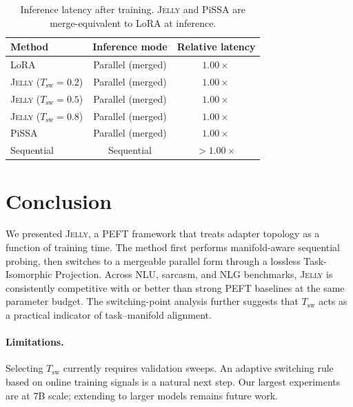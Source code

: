 \documentclass{article}
\newcommand{\Tswitch}{T_{\mathrm{sw}}}
\newcommand{\jelly}{\textsc{Jelly}}
\begin{document}
\begin{table}[!ht]
\caption{Inference latency after training. \jelly{} and PiSSA are merge-equivalent to LoRA at inference.}
\label{tab:inference_latency}
\centering
\small
\begin{tabular}{lcc}
\toprule
\textbf{Method} & \textbf{Inference mode} & \textbf{Relative latency} \\
\midrule
LoRA                       & Parallel (merged) & $1.00\times$ \\
\jelly{} ($\Tswitch=0.2$) & Parallel (merged) & $1.00\times$ \\
\jelly{} ($\Tswitch=0.5$) & Parallel (merged) & $1.00\times$ \\
\jelly{} ($\Tswitch=0.8$) & Parallel (merged) & $1.00\times$ \\
PiSSA                      & Parallel (merged) & $1.00\times$ \\
Sequential                 & Sequential        & $> 1.00\times$ \\
\bottomrule
\end{tabular}
\end{table}

\section{Conclusion}
\label{sec:conclusion}

We presented \jelly{}, a PEFT framework that treats adapter topology as a function of training time.
The method first performs manifold-aware sequential probing, then switches to a mergeable parallel form through a lossless Task-Isomorphic Projection.
Across NLU, sarcasm, and NLG benchmarks, \jelly{} is consistently competitive with or better than strong PEFT baselines at the same parameter budget.
The switching-point analysis further suggests that $\Tswitch$ acts as a practical indicator of task--manifold alignment.

\paragraph{Limitations.}
Selecting $\Tswitch$ currently requires validation sweeps.
An adaptive switching rule based on online training signals is a natural next step.
Our largest experiments are at 7B scale; extending to larger models remains future work.
\end{document}
